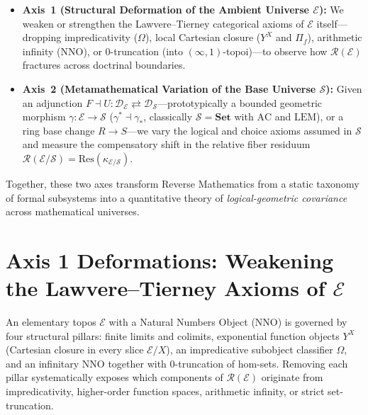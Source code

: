 \documentclass[10pt,twoside,openright]{book}
\theoremstyle{crmplain}
\theoremstyle{crmdef}
\theoremstyle{crmremark}
\begin{document}
\begin{itemize}[leftmargin=1.5em]

  \item \textbf{Axis~1 (Structural Deformation of the Ambient Universe $\mathcal{E}$):} We weaken or strengthen the Lawvere--Tierney categorical axioms of $\mathcal{E}$ itself---dropping impredicativity ($\Omega$), local Cartesian closure ($Y^X$ and $\Pi_f$), arithmetic infinity ($\mathrm{NNO}$), or $0$-truncation (into $(\infty,1)$-topoi)---to observe how $\mathcal{R}(\mathcal{E})$ fractures across doctrinal boundaries.

  \item \textbf{Axis~2 (Metamathematical Variation of the Base Universe $\mathcal{S}$):} Given an adjunction $F \dashv U : \mathcal{D}_{\mathcal{E}} \rightleftarrows \mathcal{D}_{\mathcal{S}}$---prototypically a bounded geometric morphism $\gamma : \mathcal{E} \to \mathcal{S}$ ($\gamma^* \dashv \gamma_*$, classically $\mathcal{S} = \mathbf{Set}$ with $\mathrm{AC}$ and $\mathrm{LEM}$), or a ring base change $R \to S$---we vary the logical and choice axioms assumed in $\mathcal{S}$ and measure the compensatory shift in the relative fiber residuum $\mathcal{R}(\mathcal{E}/\mathcal{S}) = \mathrm{Res}(\kappa_{\mathcal{E}/\mathcal{S}})$.

\end{itemize}

Together, these two axes transform Reverse Mathematics from a static taxonomy of formal subsystems into a quantitative theory of \emph{logical-geometric covariance} across mathematical universes.

\section{\texorpdfstring{Axis 1 Deformations: Weakening the Lawvere--Tierney Axioms of $\mathcal{E}$}{Axis 1 Deformations: Weakening the Lawvere--Tierney Axioms of E}}\label{sec:axis1-deformations}

An elementary topos $\mathcal{E}$ with a Natural Numbers Object ($\mathrm{NNO}$) is governed by four structural pillars: finite limits and colimits, exponential function objects $Y^X$ (Cartesian closure in every slice $\mathcal{E}/X$), an impredicative subobject classifier $\Omega$, and an infinitary $\mathrm{NNO}$ together with $0$-truncation of hom-sets. Removing each pillar systematically exposes which components of $\mathcal{R}(\mathcal{E})$ originate from impredicativity, higher-order function spaces, arithmetic infinity, or strict set-truncation.
\end{document}
